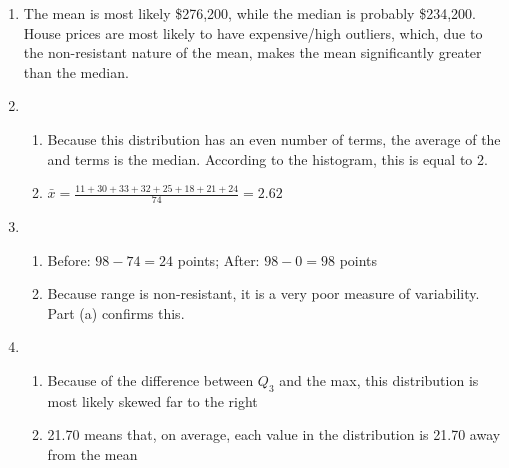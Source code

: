 \documentclass[12pt]{article}
\begin{document}
\begin{enumerate}
\begin{enumerate}
    \end{enumerate}

    \setcounter{enumi}{92}

  \item The mean is most likely \$276,200, while the median is probably \$234,200. House prices are most likely to have expensive/high outliers, which, due to the non-resistant nature of the mean, makes the mean significantly greater than the median.

    \setcounter{enumi}{94}

  \item

    \begin{enumerate}

      \item Because this distribution has an even number of terms, the average of the  and  terms is the median. According to the histogram, this is equal to 2. 

      \item $\bar{x}=\frac{11+30+33+32+25+18+21+24}{74}=2.62$

    \end{enumerate}

    \setcounter{enumi}{96}

  \item

    \begin{enumerate}

      \item Before: $98 - 74=24$ points; After: $98 - 0=98$ points

      \item Because range is non-resistant, it is a very poor measure of variability. Part (a) confirms this.

    \end{enumerate}

    \setcounter{enumi}{108}

  \item

    \begin{enumerate}

      \item Because of the difference between $Q_3$ and the max, this distribution is most likely skewed far to the right

      \item 21.70 means that, on average, each value in the distribution is 21.70 away from the mean


\end{enumerate}
\end{enumerate}
\end{document}
